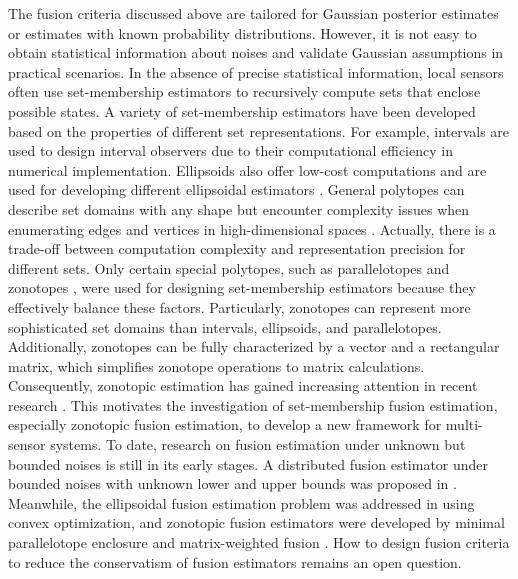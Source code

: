 	The fusion criteria discussed above are tailored for Gaussian posterior estimates or estimates with known probability distributions. However, it is not easy to obtain statistical information about noises and validate Gaussian assumptions in practical scenarios. In the absence of precise statistical information, local sensors often use set-membership estimators to recursively compute sets that enclose possible states. A variety of set-membership estimators have been developed based on the properties of different set representations. For example, intervals are used to design interval observers \cite{gouze2000interval, mazenc2011interval, raissi2012interval, combastel2013stable, efimov2013interval} due to their computational efficiency in numerical implementation. Ellipsoids also offer low-cost computations and are used for developing different ellipsoidal estimators \cite{a.1997ellipsoidal, polyak2004ellipsoidal, durieu2001multiinput, bertsekas1971recursive, schweppe1968recursive}. General polytopes can describe set domains with any shape but encounter complexity issues when enumerating edges and vertices in high-dimensional spaces {\cite{ziegler2012lectures}}. Actually, there is a trade-off between computation complexity and representation precision for different sets. Only certain special polytopes, such as parallelotopes \cite{chisci1996recursive, vicino1996sequential} and zonotopes \cite{puig2001worstcase, combastel2003state, alamo2005guaranteed, le2013zonotopic, combastel2015zonotopes, depaula2022zonotopic}, were used for designing set-membership estimators because they effectively balance these factors. Particularly, zonotopes can represent more sophisticated set domains than intervals, ellipsoids, and parallelotopes. Additionally, zonotopes can be fully characterized by a vector and a rectangular matrix, which simplifies zonotope operations to matrix calculations. Consequently, zonotopic estimation has gained increasing attention in recent research \cite{kousik2023ellipsotopes, scott2016constrained, combastel2020distributed, kochdumper2021sparse, combastel2022functional, althoff2021set}. This motivates the investigation of set-membership fusion estimation, especially zonotopic fusion estimation, to develop a new framework for multi-sensor systems. To date, research on fusion estimation under unknown but bounded noises is still in its early stages. A distributed fusion estimator under bounded noises with unknown lower and upper bounds was proposed in \cite{chen2019new}. Meanwhile, the ellipsoidal fusion estimation problem was addressed in \cite{wang2019ellipsoidal} using convex optimization, and zonotopic fusion estimators were developed by minimal parallelotope enclosure \cite{zhang2023distributed} and matrix-weighted fusion \cite{zhao2023zonotopic}. How to design fusion criteria to reduce the conservatism of fusion estimators remains an open question.
		
